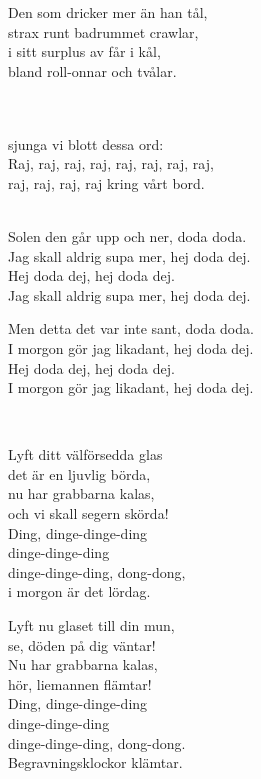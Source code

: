 \songtext{}Den som dricker mer än han tål,\\
strax runt badrummet crawlar,\\
i sitt surplus av får i kål,\\
bland roll-onnar och tvålar. \\

 \\       

\\
sjunga vi blott dessa ord:\\
Raj, raj, raj, raj, raj, raj, raj, raj,\\
raj, raj, raj, raj kring vårt bord.\\

 \\       

\songtext{}Solen den går upp och ner, doda doda.\\
Jag skall aldrig supa mer, hej doda dej.\\
Hej doda dej, hej doda dej.\\
Jag skall aldrig supa mer, hej doda dej.

Men detta det var inte sant, doda doda.\\
I morgon gör jag likadant, hej doda dej.\\
Hej doda dej, hej doda dej.\\
I morgon gör jag likadant, hej doda dej. \\

\newpage

 \\       

\songtext{}
Lyft ditt välförsedda glas\\
det är en ljuvlig börda,\\
nu har grabbarna kalas,\\
och vi skall segern skörda!\\
Ding, dinge-dinge-ding\\
dinge-dinge-ding\\
dinge-dinge-ding, dong-dong,\\
i morgon är det lördag.

Lyft nu glaset till din mun,\\
se, döden på dig väntar!\\
Nu har grabbarna kalas,\\
hör, liemannen flämtar!\\
Ding, dinge-dinge-ding\\
dinge-dinge-ding\\
dinge-dinge-ding, dong-dong.\\
Begravningsklockor klämtar.

